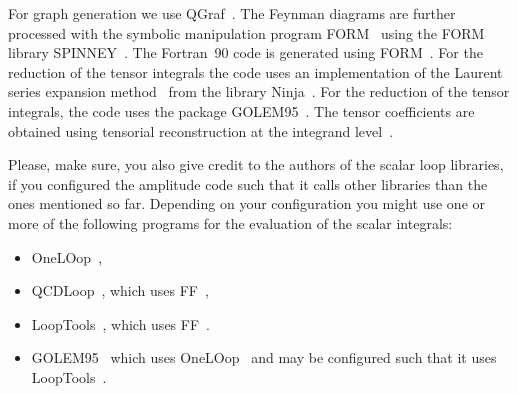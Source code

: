 \documentclass[a4paper]{article}
\begin{document}
For graph generation we use QGraf~\cite{Nogueira:1991ex}.
The Feynman diagrams are further processed with the symbolic manipulation
program FORM~\cite{Kuipers:2012rf,Vermaseren:2000nd} using the FORM library
SPINNEY~\cite{Cullen:2010jv}.
The Fortran~90 code is generated using
FORM~\cite{Kuipers:2012rf,Vermaseren:2000nd}.
For the reduction of the tensor integrals
the code uses an implementation of the Laurent series expansion
method~\cite{Mastrolia:2012bu}
from the library Ninja~\cite{Peraro:2014cba}.
For
the reduction of the tensor integrals, the code uses the
package GOLEM95~\cite{Guillet:2013msa,Binoth:2008uq,Cullen:2011kv}.
The tensor coefficients are
obtained using tensorial reconstruction at the integrand
level~\cite{Heinrich:2010ax}.

Please, make sure, you also give credit to the authors of the scalar
loop libraries, if you configured the amplitude code such that it calls
other libraries than the ones mentioned so far. Depending on your
configuration you might use one or more of the following programs for
the evaluation of the scalar integrals:
\begin{itemize}
\item OneLOop~\cite{vanHameren:2010cp},
\item QCDLoop~\cite{Ellis:2007qk}, which uses FF~\cite{vanOldenborgh:1990yc},
\item LoopTools~\cite{Hahn:1998yk}, which uses FF~\cite{vanOldenborgh:1990yc}.
\item GOLEM95~\cite{Binoth:2008uq,Guillet:2013msa} which uses OneLOop~\cite{vanHameren:2010cp}
   and may be configured such that it uses
   LoopTools~\cite{Hahn:1998yk,vanOldenborgh:1990yc}.
\end{itemize}
\end{document}
